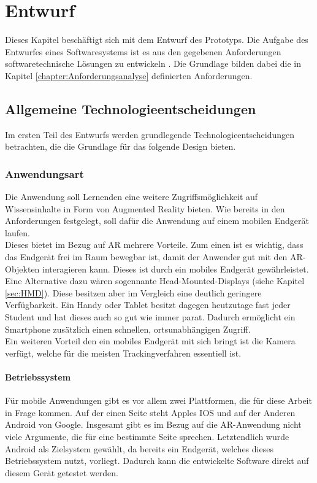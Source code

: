 \chapter{Entwurf}\label{chapter:entwurf}
Dieses Kapitel beschäftigt sich mit dem Entwurf des Prototyps. Die Aufgabe des Entwurfes eines Softwaresystems ist es aus den gegebenen Anforderungen softwaretechnische Lösungen zu entwickeln \citep{balzert:softwaretechnik}. Die Grundlage bilden dabei die in Kapitel \ref{chapter:Anforderungsanalyse} definierten Anforderungen.

\section{Allgemeine Technologieentscheidungen}
Im ersten Teil des Entwurfs werden grundlegende Technologieentscheidungen betrachten, die die Grundlage für das folgende Design bieten.

\subsection{Anwendungsart}
Die Anwendung soll Lernenden eine weitere Zugriffsmöglichkeit auf Wissensinhalte in Form von Augmented Reality bieten.
Wie bereits in den Anforderungen festgelegt, soll dafür die Anwendung auf einem mobilen Endgerät laufen.\\
Dieses bietet im Bezug auf AR mehrere Vorteile. Zum einen ist es wichtig, dass das Endgerät frei im Raum bewegbar ist, damit der Anwender gut mit den AR-Objekten interagieren kann. Dieses ist durch ein mobiles Endgerät gewährleistet. Eine Alternative dazu wären sogennante Head-Mounted-Displays (siehe Kapitel \ref{sec:HMD}). Diese besitzen aber im Vergleich eine deutlich geringere Verfügbarkeit. Ein Handy oder Tablet besitzt dagegen heutzutage fast jeder Student und hat dieses auch so gut wie immer parat. Dadurch ermöglicht ein Smartphone zusätzlich einen schnellen, ortsunabhängigen Zugriff. \\
Ein weiteren Vorteil den ein mobiles Endgerät mit sich bringt ist die Kamera verfügt, welche für die meisten Trackingverfahren essentiell ist. \\

\subsubsection{Betriebssystem}
Für mobile Anwendungen gibt es vor allem zwei Plattformen, die für diese Arbeit in Frage kommen. Auf der einen Seite steht Apples IOS und auf der Anderen Android von Google. Insgesamt gibt es im Bezug auf die AR-Anwendung nicht viele Argumente, die für eine bestimmte Seite sprechen. Letztendlich wurde Android als Zielsystem gewählt, da bereits ein Endgerät, welches dieses Betriebssystem nutzt, vorliegt. Dadurch kann die entwickelte Software direkt auf diesem Gerät getestet werden. 

